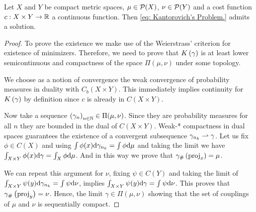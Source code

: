 \begin{theorem} Let $X$ and $Y$ be compact metric spaces, $\mu \in \mathcal{P}(X)$, $\nu \in \mathcal{P}(Y)$ and a cost function $c: X\times Y \rightarrow \mathbb{R}$ a continuous function. Then \eqref{eq: Kantorovich's Problem.} admits a solution.
\end{theorem}
\begin{proof}
	To prove the existence we make use of the Weierstrass’ criterion for existence of minimizers. Therefore, we need to prove that $K\left(\gamma\right)$ is at least lower semicontinuous and compactness of the space $\Pi(\mu, \nu)$ under some topology. 
	
	We choose as a notion of convergence the weak convergence of probability measures in duality with $C_b(X\times Y)$. This immediately implies continuity for $K\left(\gamma\right)$ by definition since $c$ is already in $C(X\times Y)$. 
	
	Now take a sequence $\left( \gamma_n \right)_{n\in\mathbb{N}} \in \Pi(\mu, \nu)$. Since they are probability measures for all $n$ they are bounded in the dual of $C(X\times Y)$. Weak-* compactness in dual spaces guarantees the existence of a convergent subsequence $\gamma_{n_k} \rightharpoonup \gamma$. Let us fix $\phi \in C(X)$ and using $\int\phi(x) \mathrm{d} \gamma_{n_k}=\int \phi \mathrm{d}\mu$ and taking the limit we have $\int_{X\times Y}\phi(x) \mathrm{d} \gamma=\int_{X} \phi \mathrm{d}\mu$. And in this way we prove that ${\gamma}_{\#} \left( \mathrm{proj}_x \right)=\mu$. 
	
	We can repeat this argument for $\nu$, fixing $\psi \in C(Y)$ and taking the limit of $\int_{X\times Y} \psi(y) \mathrm{d} \gamma_{n_k}=\int \psi \mathrm{d}\nu$, implies $\int_{X\times Y} \psi(y) \mathrm{d} \gamma=\int \psi \mathrm{d}\nu$. This proves that ${\gamma}_{\#} \left( \mathrm{proj}_y \right)=\nu$. Hence, the limit $\gamma \in \Pi(\mu, \nu)$ showing that the set of couplings of $\mu$ and $\nu$ is sequentially compact. 
\end{proof}

